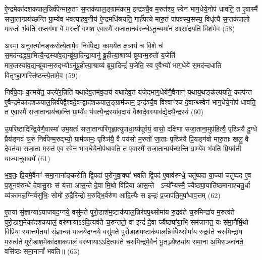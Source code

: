 {\anuvakamend[{रु॒द्रो भे॑ष॒जं वि॒न्दते॒ यदि॑ स्तृणी॒याद॒र्द्धन्द्वाद॑श च।10।}]}

ऐ॒न्द्रमेका॑दशकपाल॒न्निर्व॑पेन्मारु॒तꣳ स॒प्तक॑पाल॒ङ्ग्राम॑काम॒ इन्द्र॑ञ्चै॒व म॒रुत॑श्च॒ स्वेन॑ भाग॒धेये॒नोप॑ धावति॒ त ए॒वास्मै॑ सजा॒तान्प्रय॑च्छन्ति ग्रा॒म्ये॑व भ॑वत्याहव॒नीय॑ ऐ॒न्द्रमधि॑श्रयति॒ गार्\mbox{}ह॑पत्ये मारु॒तं पा॑पवस्य॒सस्य॒ विधृ॑त्यै स॒प्तक॑पालो मारु॒तो भ॑वति स॒प्तग॑णा॒ वै म॒रुतो॑ गण॒श ए॒वास्मै॑ सजा॒तानव॑रुन्धे\-ऽनू॒च्यमा॑न॒ आसा॑दयति॒ विश॑मे॒व (58)

अ॒स्मा॒ अनु॑वर्त्मानङ्करोत्ये॒तामे॒व निर्व॑पे॒द्यः का॒मये॑त क्ष॒त्राय॑ च वि॒शे च॑ स॒मद॑न्दद्ध्या॒मित्यै॒न्द्रस्या॑व॒द्यन्ब्रू॑या॒दिन्द्रा॒यानु॑ ब्रू॒हीत्या॒श्राव्य॑ ब्रूयान्म॒रुतो॑ य॒जेति॑ मारु॒तस्या॑व॒द्यन्ब्रू॑यान्म॒रुद्भ्यो\-ऽनु॑ब्रू॒हीत्या॒श्राव्य॑ ब्रूया॒दिन्द्रं॑ य॒जेति॒ स्व ए॒वैभ्यो॑ भाग॒धेये॑ स॒मद॑न्दधाति वितृꣳहा॒णास्ति॑ष्ठन्त्ये॒तामे॒व (59)

निर्व॑पे॒द्यः का॒मये॑त॒ कल्पे॑र॒न्निति॑ यथादेव॒तम॑व॒दाय॑ यथादेव॒तं य॑जेद्भाग॒धेये॑नै॒वैनान्॑ यथाय॒थङ्क॑ल्पयति॒ कल्प॑न्त ए॒वैन्द्रमेका॑दशकपाल॒न्निर्व॑पेद्वैश्वदे॒वन्द्वाद॑शकपाल॒ङ्ग्राम॑काम॒ इन्द्र॑ञ्चै॒व विश्वाꣳ॑श्च दे॒वान्थ्स्वेन॑ भाग॒धेये॒नोप॑ धावति॒ त ए॒वास्मै॑ सजा॒तान्प्रय॑च्छन्ति ग्रा॒म्ये॑व भ॑वत्यै॒न्द्रस्या॑व॒दाय॑ वैश्वदे॒वस्याव॑द्ये॒दथै॒न्द्रस्य॑ (60)

उ॒परि॑ष्टादिन्द्रि॒येणै॒वास्मा॑ उभ॒यतः॑ सजा॒तान्परि॑गृह्णात्युपाधा॒य्य॑पूर्वयं॒ वासो॒ दक्षि॑णा सजा॒ताना॒मुप॑हित्यै॒ पृश्ञि॑यै दु॒ग्धे प्रैय॑ङ्गवं च॒रुं निर्व॑पेन्म॒रुद्भ्यो॒ ग्राम॑कामः॒ पृश्ञि॑यै॒ वै पय॑सो म॒रुतो॑ जा॒ताः पृश्ञि॑यै प्रि॒यङ्ग॑वो मारु॒ताः खलु॒ वै दे॒वत॑या सजा॒ता म॒रुत॑ ए॒व स्वेन॑ भाग॒धेये॒नोप॑धावति॒ त ए॒वास्मै॑ सजा॒तान्प्रय॑च्छन्ति ग्रा॒म्ये॑व भ॑वति प्रि॒यव॑ती याज्यानुवा॒क्ये᳚ (61)

भ॒व॒तः॒ प्रि॒यमे॒वैनꣳ॑ समा॒नाना᳚ङ्करोति द्वि॒पदा॑ पुरोनुवा॒क्या॑ भवति द्वि॒पद॑ ए॒वाव॑रुन्धे॒ चतु॑ष्पदा या॒ज्या॑ चतु॑ष्पद ए॒व प॒शूनव॑रुन्धे देवासु॒राः सं य॑त्ता आस॒न्ते दे॒वा मि॒थो विप्रि॑या आस॒न्ते  \-ऽन्यो᳚न्यस्मै॒ ज्यैष्ठ्या॒याति॑ष्ठमानाश्चतु॒र्धा व्य॑क्रामन्न॒ग्निर्वसु॑भिः॒ सोमो॑ रु॒द्रैरिन्द्रो॑ म॒रुद्भि॒र्वरु॑ण आदि॒त्यैः स इन्द्रः॑ प्र॒जाप॑ति॒मुपा॑धाव॒त्तम् (62)

ए॒तया॑ सं॒ज्ञान्या॑\-ऽयाजयद॒ग्नये॒ वसु॑मते पुरो॒डाश॑म॒ष्टाक॑पाल॒न्निर॑वप॒थ्सोमा॑य रु॒द्रव॑ते च॒रुमिन्द्रा॑य म॒रुत्व॑ते पुरो॒डाश॒मेका॑दशकपालं॒ वरु॑णाया\-ऽ\-ऽदि॒त्यव॑ते च॒रुन्ततो॒ वा इन्द्रं॑ दे॒वा ज्यैष्ठ्या॑या॒भि सम॑जानत॒ यः स॑मा॒नैर्मि॒थो विप्रि॑यः॒ स्यात्तमे॒तया॑ सं॒ज्ञान्या॑ याजयेद॒ग्नये॒ वसु॑मते पुरो॒डाश॑म॒ष्टाक॑पाल॒न्निर्व॑पे॒थ्सोमा॑य रु॒द्रव॑ते च॒रुमिन्द्रा॑य म॒रुत्व॑ते पुरो॒डाश॒मेका॑दशकपालं॒ वरु॑णाया\-ऽ\-ऽदि॒त्यव॑ते च॒रुमिन्द्र॑मे॒वैनं॑ भू॒तञ्ज्यैष्ठ्या॑य समा॒ना अ॒भिसञ्जा॑नते॒ वसि॑ष्ठः समा॒नानां᳚ भवति॥ (63)

